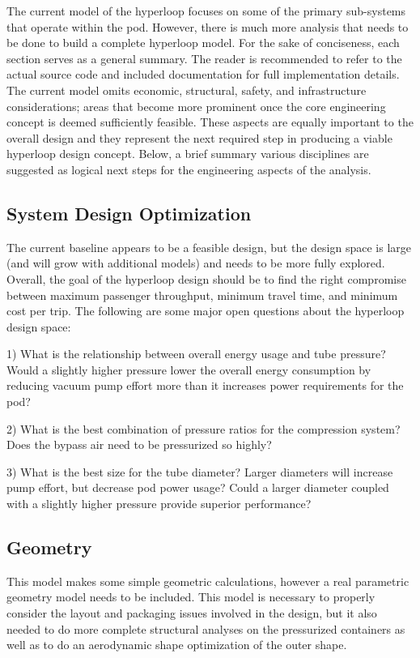 \documentclass[heading.tex]{subfiles}
\begin{document}
\newpage
\appendix

 \label{app:future}

The current model of the hyperloop focuses on some of the primary sub-systems that operate within the pod. However, there is much more
analysis that needs to be done to build a complete hyperloop model.
For the sake of conciseness, each section serves as a general summary. The reader is recommended to refer to the actual source code and
included documentation for full implementation details. The current model omits economic, structural, safety, and infrastructure
considerations; areas that become more prominent once the core engineering concept is deemed sufficiently feasible. These aspects are
equally important to the overall design and they represent the next required step in producing a viable hyperloop design concept.
Below, a brief summary various disciplines are suggested as logical next steps for the engineering aspects of the analysis.

\subsection{System Design Optimization}
The current baseline appears to be a feasible design, but the design space is large (and will grow with additional models) and needs to be
more fully explored. Overall, the goal of the hyperloop design should be to find the right compromise between maximum passenger
throughput, minimum travel time, and minimum cost per trip. The following are some major open questions about the hyperloop design
space:

1) What is the relationship between overall energy usage and tube pressure? Would a slightly higher pressure lower the overall energy
consumption by reducing vacuum pump effort more than it increases power requirements for the pod?

2) What is the best combination of pressure ratios for the compression system? Does the bypass air need to be pressurized so highly?

3) What is the best size for the tube diameter? Larger diameters will increase pump effort, but decrease pod power usage? Could a larger
diameter coupled with a slightly higher pressure provide superior performance?

\subsection{Geometry}
This model makes some simple geometric calculations, however a real parametric geometry model needs to be included. This model is
necessary to properly consider the layout and packaging issues involved in the design, but it also needed to do more complete structural
analyses on the pressurized containers as well as to do an aerodynamic shape optimization of the outer shape.
\end{document}
